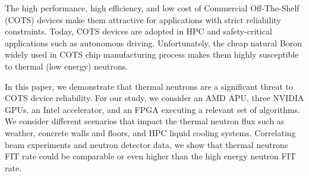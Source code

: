 The high performance, high efficiency, and low cost of Commercial Off-The-Shelf (COTS) devices make them attractive for applications with strict reliability constraints. Today, COTS devices are adopted in HPC and safety-critical applications such as autonomous driving. Unfortunately, the cheap natural Boron widely used in COTS chip manufacturing process makes them highly susceptible to thermal (low energy) neutrons.
 
In this paper, we demonstrate that thermal neutrons are a significant threat to COTS device reliability. For our study, we consider an AMD APU, three NVIDIA GPUs, an Intel accelerator, and an FPGA executing a relevant set of algorithms. We consider different scenarios that impact the thermal neutron flux such as weather, concrete walls and floors, and HPC liquid cooling systems. Correlating beam experiments and neutron detector data, we show that thermal neutrons 
FIT rate could be 
comparable or even higher than the high energy neutron FIT rate.

